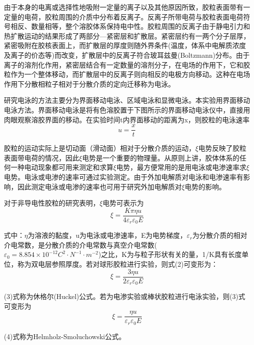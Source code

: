 \documentclass[12pt,hyperref,a4paper,UTF8]{ctexart}
\begin{document}
由于本身的电离或选择性地吸附一定量的离子以及其他原因所致，胶粒表面带有一定量的电荷，胶粒周围的介质中分布着反离子。反离子所带电荷与胶粒表面电荷符号相反、数量相等，整个溶胶体系保持电中性。胶粒周围的反离子由于静电引力和热扩散运动的结果形成了两部分---紧密层和扩散层。紧密层约有一两个分子层厚，紧密吸附在胶核表面上，而扩散层的厚度则随外界条件(温度，体系中电解质浓度及离子的价态等)而改变，扩散层中的反离子符合玻耳兹曼(Boltzmann)分布。由于离子的溶剂化作用，紧密层结合有一定数量的溶剂分子，在电场的作用下，它和胶粒作为一个整体移动，而扩散层中的反离子则向相反的电极方向移动。这种在电场作用下分散相粒子相对于分散介质的定向迁移称为电泳。

研究电泳的方法主要分为界面移动电泳、区域电泳和显微电泳。本实验用界面移动电泳方法。界面移动电泳是将有色溶胶置于下图所示的界面移动电泳仪中，直接用肉眼观察溶胶界面的移动。在实验时间t内界面移动的距离为x，则胶粒的电泳速率
\begin{equation}
    u = \frac{x}{t}
\end{equation}

胶粒的运动实际上是切动面（滑动面）相对于分散介质的运动，$\xi$电势反映了胶粒表面带电荷的情况，因此$\xi$电势是一个重要的物理量。从原则上讲，胶体体系的任何一种电动现象都可用来测定和求算$\xi$电势，最方便常用的是用电泳或电渗速率求$\xi$电势。电泳或电渗的速率可通过实验测定。由于外加电解质对电泳和电渗速率有影响，因此测定电泳或电渗的速率也可用于研究外加电解质对$\xi$电势的影响。

对于非导电性胶粒的研究表明，$\xi$电势可表示为
\begin{equation}
    \xi = \frac{K\pi \eta u}{4\varepsilon_r \varepsilon_0 E}
\end{equation}

式中：$\eta$为溶液的黏度，u为电泳或电渗速率，E为电势梯度，$\varepsilon_r$为分散介质的相对介电常数，是分散介质的介电常数与真空介电常数($\varepsilon_0 = 8.854\times 10^{-12}C^2 \cdot N^{-1} \cdot m^{-2}$)之比，K为与粒子形状有关的量，1/K具有长度单位，称为双电层参照厚度。若对球形胶粒进行实验，则式(2)可变形为：
\begin{equation}
    \xi = \frac{3\eta u}{2\varepsilon_r \varepsilon_0 E}
\end{equation}

(3)式称为休格尔(Huckel)公式。若为电渗实验或棒状胶粒进行电泳实验，则(3)式可变形为
\begin{equation}
    \xi = \frac{\eta u}{\varepsilon_r \varepsilon_0 E}
\end{equation}

(4)式称为Helmholz-Smoluchowski公式。
\end{document}
